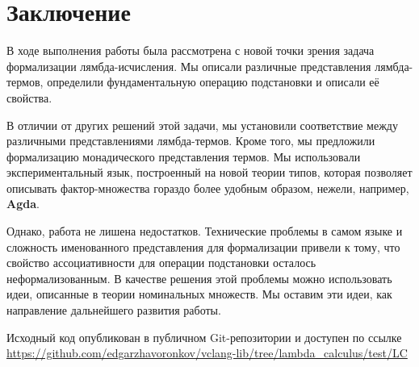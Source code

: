 \section*{Заключение}


В ходе выполнения работы была рассмотрена с новой точки зрения задача формализации лямбда-исчисления. Мы описали различные представления лямбда-термов, определили фундаментальную операцию подстановки и описали её свойства.

В отличии от других решений этой задачи, мы установили соответствие между различными представлениями лямбда-термов. Кроме того, мы предложили формализацию монадического представления термов. Мы использовали экспериментальный язык, построенный на новой теории типов, которая позволяет описывать фактор-множества гораздо более удобным образом, нежели, например, \textbf{Agda}.

Однако, работа не лишена недостатков. Технические проблемы в самом языке и сложность именованного представления для формализации привели к тому, что свойство ассоциативности для операции подстановки осталось неформализованным. В качестве решения этой проблемы можно использовать идеи, описанные в теории номинальных множеств. Мы оставим эти идеи, как направление дальнейшего развития работы.

Исходный код опубликован в публичном Git-репозитории и доступен по ссылке \url{https://github.com/edgarzhavoronkov/vclang-lib/tree/lambda_calculus/test/LC}
